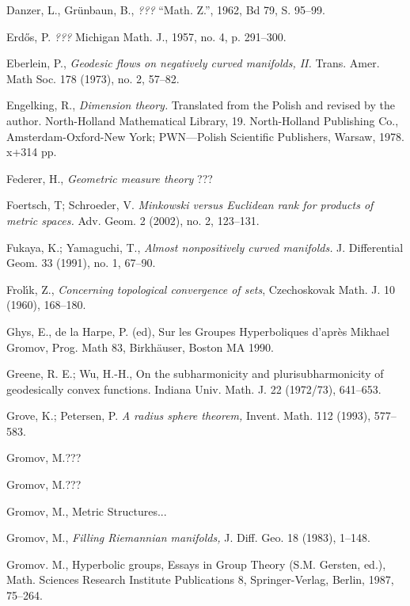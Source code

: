 \begin{thebibliography}{52}
Danzer, L., Gr\"unbaun, B., \textit{???} ``Math. Z.'',
1962, Bd 79, S. 95--99.

 Erd\H{o}s, P. \textit{???} Michigan Math. J., 1957, no. 4,
p. 291--300.

Eberlein, P., \textit{Geodesic flows on negatively curved manifolds, II.}  Trans. Amer. Math Soc. 178  (1973),  no. 2, 57--82.

 Engelking, R., \textit{Dimension theory.} Translated from the Polish and revised by the author. North-Holland Mathematical Library, 19. North-Holland Publishing Co., Amsterdam-Oxford-New York; PWN---Polish Scientific Publishers, Warsaw, 1978. x+314 pp.

Federer, H., \textit{Geometric measure theory} ???

Foertsch, T;  Schroeder, V. \textit{Minkowski versus Euclidean rank for products of metric spaces.}  Adv. Geom.  2  (2002),  no. 2, 123--131.

Fukaya, K.; Yamaguchi, T., \textit{Almost nonpositively curved manifolds.}  J. Differential Geom.  33  (1991),  no. 1, 67--90.

 Frol\'{\i}k, Z., \textit{Concerning topological convergence of sets}, Czechoskovak Math. J. 10 (1960), 168--180.

   Ghys, E., de la Harpe, P. (ed), Sur les Groupes Hyperboliques d'apr\`{e}s Mikhael Gromov, Prog. Math 83, Birkh\"{a}user, Boston MA 1990.


 Greene, R. E.; Wu, H.-H., On the subharmonicity and plurisubharmonicity of geodesically convex
functions.
Indiana Univ. Math. J. 22 (1972/73), 641--653.

  Grove, K.; Petersen, P. \textit{A radius sphere theorem,}
Invent. Math. 112 (1993), 577--583.

Gromov, M.???

 Gromov, M.???

 Gromov, M., Metric Structures...

  Gromov, M., \textit{Filling Riemannian manifolds,} J. Diff. Geo. 18 (1983), 1--148.


Gromov. M.,
Hyperbolic groups, 
Essays in Group Theory (S.M. Gersten, ed.),
Math. Sciences Research Institute Publications 8,
Springer-Verlag, Berlin,
1987, 75--264.


\end{thebibliography}
